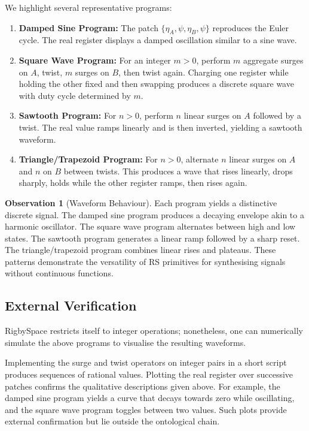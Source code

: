 \documentclass[11pt, letterpaper]{article}
\newcommand{\aop}{\eta}
\newcommand{\psiop}{\psi}
\theoremstyle{definition}
\newtheorem{observation}{Observation}[section]
\theoremstyle{plain}
\begin{document}
We highlight several representative programs:

\begin{enumerate}[label=\arabic*.]
  \item \textbf{Damped Sine Program:} The patch $\{\aop_A, \psiop,
    \aop_B, \psiop\}$ reproduces the Euler cycle.  The real register displays a
    damped oscillation similar to a sine wave.
  \item \textbf{Square Wave Program:} For an integer $m>0$, perform $m$
    aggregate surges on $A$, twist, $m$ surges on $B$, then twist again.
    Charging one register while holding the other fixed and then swapping
    produces a discrete square wave with duty cycle determined by $m$.
  \item \textbf{Sawtooth Program:} For $n>0$, perform $n$ linear surges on
    $A$ followed by a twist.  The real value ramps linearly and is then
    inverted, yielding a sawtooth waveform.
  \item \textbf{Triangle/Trapezoid Program:} For $n>0$, alternate $n$ linear
    surges on $A$ and $n$ on $B$ between twists.  This produces a wave that
    rises linearly, drops sharply, holds while the other register ramps, then
    rises again.
\end{enumerate}

\begin{observation}[Waveform Behaviour]
Each program yields a distinctive discrete signal.  The damped sine program
produces a decaying envelope akin to a harmonic oscillator.  The square wave
program alternates between high and low states.  The sawtooth program
generates a linear ramp followed by a sharp reset.  The triangle/trapezoid
program combines linear rises and plateaus.  These patterns demonstrate the
versatility of RS primitives for synthesising signals without continuous
functions.
\end{observation}

\subsection{External Verification}

RigbySpace restricts itself to integer operations; nonetheless, one can
numerically simulate the above programs to visualise the resulting waveforms.

\begin{verifybox}
  Implementing the surge and twist operators on integer pairs in a short
  script produces sequences of rational values.  Plotting the real register
  over successive patches confirms the qualitative descriptions given above.
  For example, the damped sine program yields a curve that decays towards
  zero while oscillating, and the square wave program toggles between two
  values.  Such plots provide external confirmation but lie outside the
  ontological chain.
\end{verifybox}
\end{document}
